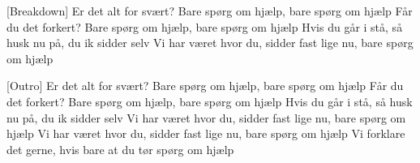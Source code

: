 \documentclass[a4paper,11pt]{article}
\begin{document}
\begin{song}
[Breakdown] Er det alt for svært?
    Bare spørg om hjælp, bare spørg om hjælp
    Får du det forkert?
    Bare spørg om hjælp, bare spørg om hjælp
    Hvis du går i stå, så husk nu på, du ik sidder selv
    Vi har været hvor du, sidder fast lige nu, bare spørg om hjælp

[Outro] Er det alt for svært?
    Bare spørg om hjælp, bare spørg om hjælp
    Får du det forkert?
    Bare spørg om hjælp, bare spørg om hjælp
    Hvis du går i stå, så husk nu på, du ik sidder selv
    Vi har været hvor du, sidder fast lige nu, bare spørg om hjælp
    Vi har været hvor du, sidder fast lige nu, bare spørg om hjælp
    Vi forklare det gerne, hvis bare at du tør spørg om hjælp

    
\end{song}
\end{document}
